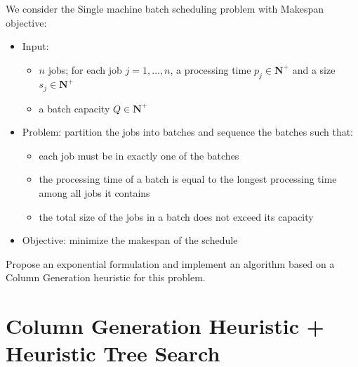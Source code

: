 \documentclass[a4paper]{article}
\newcommand{\N}{\mathbf{N}}
\begin{document}
We consider the Single machine batch scheduling problem with Makespan objective:
\begin{itemize}
  \item Input:
    \begin{itemize}
      \item $n$ jobs; for each job $j = 1, \dots, n$, a processing time $p_j \in \N^+$ and a size $s_j \in \N^+$
      \item a batch capacity $Q \in \N^+$
    \end{itemize}
  \item Problem: partition the jobs into batches and sequence the batches such that:
    \begin{itemize}
      \item each job must be in exactly one of the batches
      \item the processing time of a batch is equal to the longest processing time among all jobs it contains
      \item the total size of the jobs in a batch does not exceed its capacity
    \end{itemize}
  \item Objective: minimize the makespan of the schedule
\end{itemize}

Propose an exponential formulation and implement an algorithm based on a Column Generation heuristic for this problem.

\section{Column Generation Heuristic + Heuristic Tree Search}
\end{document}
